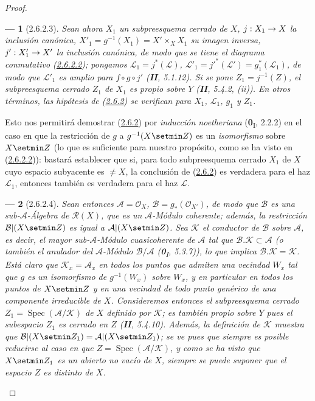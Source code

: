 \documentclass[10pt,oneside,openany]{book}
\theoremstyle{egaenv}\newtheorem*{env}{---}
\theoremstyle{egastatement}
\theoremstyle{egadescription}
\newcommand{\oldpage}[2][]{\marginnote{\normalfont\scriptsize\textbf{#1}\,|\,#2}\ignorespaces}
\renewcommand{\to}{\mathchoice{\longrightarrow}{\rightarrow}{\rightarrow}{\rightarrow}}
\begin{document}
\begin{proof}
\begin{env}[2.6.2.3]
\label{III.2.6.2.3-fr}
Sean ahora $X_1$ un \emph{subpreesquema cerrado} de $X$,
$j:X_1\to X$ la inclusión canónica,
$X'_1=g^{-1}(X_1)=X'\times_X X_1$ su imagen inversa,
$j':X'_1\to X'$ la inclusión canónica, de modo que se tiene el diagrama
conmutativo (\hyperref[III.2.6.2.2-fr]{2.6.2.2}); pongamos
$\mathcal L_1=j^*(\mathcal L)$,
$\mathcal L'_1=j'^*(\mathcal L')=g_1^*(\mathcal L_1)$, de modo que
$\mathcal L'_1$ es amplio para $f\circ g\circ j'$ (\textbf{II}, 5.1.12). Si se
pone $Z_1=j^{-1}(Z)$, el subpreesquema cerrado $Z_1$ de $X_1$ es propio
sobre $Y$ (\textbf{II}, 5.4.2, (ii)). En otros términos, \emph{las hipótesis de}
(\hyperref[III.2.6.2-fr]{2.6.2}) \emph{se verifican para} $X_1$,
$\mathcal L_1$, $g_1$ y $Z_1$.
\end{env}

\oldpage[III]{113}
Esto nos permitirá demostrar
(\hyperref[III.2.6.2-fr]{2.6.2}) por \emph{inducción noetheriana}
(\textbf{0}\textsubscript{I}, 2.2.2) en el caso en que la restricción de $g$ a
$g^{-1}(X\setmin Z)$ es un \emph{isomorfismo} sobre $X\setmin Z$ (lo que es suficiente para
nuestro propósito, como se ha visto en
(\hyperref[III.2.6.2.2-fr]{2.6.2.2})): bastará establecer que si, para
todo subpreesquema cerrado $X_1$ de $X$ cuyo espacio subyacente es
$\neq X$, la conclusión de (\hyperref[III.2.6.2-fr]{2.6.2}) es verdadera
para el haz $\mathcal L_1$, entonces también es verdadera para el
haz $\mathcal L$.

\begin{env}[2.6.2.4]
\label{III.2.6.2.4-fr}
Sean entonces $\mathcal A=\mathcal O_X$, $\mathcal B=g_*(\mathcal O_{X'})$,
de modo que $\mathcal B$ es una sub-$\mathcal A$-Álgebra de
$\mathcal R(X)$, que es un $\mathcal A$-Módulo coherente; además, la
restricción $\mathcal B|(X\setmin Z)$ es igual a $\mathcal A|(X\setmin Z)$. Sea
$\mathcal K$ el \emph{conductor} de $\mathcal B$ sobre $\mathcal A$, es decir,
el mayor sub-$\mathcal A$-Módulo cuasicoherente de $\mathcal A$ tal
que $\mathcal B.\mathcal K\subset\mathcal A$ (o también el \emph{anulador} del
$\mathcal A$-Módulo $\mathcal B/\mathcal A$
(\textbf{0}\textsubscript{I}, 5.3.7)), lo que implica
$\mathcal B.\mathcal K=\mathcal K$. Está claro que
$\mathcal K_x=\mathcal A_x$ en todos los puntos que admiten una vecindad
$W_x$ tal que $g$ es un isomorfismo de $g^{-1}(W_x)$ sobre $W_x$, y en
particular en todos los puntos de $X\setmin Z$ y en una vecindad de todo
punto genérico de una componente irreducible de $X$. Consideremos entonces
el subpreesquema cerrado $Z_1=\operatorname{Spec}(\mathcal A/\mathcal K)$
de $X$ definido por $\mathcal K$; es también \emph{propio} sobre $Y$ pues el
subespacio $Z_1$ es cerrado en $Z$ (\textbf{II}, 5.4.10). Además, la definición
de $\mathcal K$ muestra que
$\mathcal B|(X\setmin Z_1)=\mathcal A|(X\setmin Z_1)$; se ve pues que siempre es posible
reducirse al caso en que
$Z=\operatorname{Spec}(\mathcal A/\mathcal K)$, y como se ha visto que
$X\setmin Z_1$ es un abierto no vacío de $X$, siempre se puede suponer que
el espacio $Z$ es \emph{distinto} de $X$.
\end{env}


\end{proof}
\end{document}
